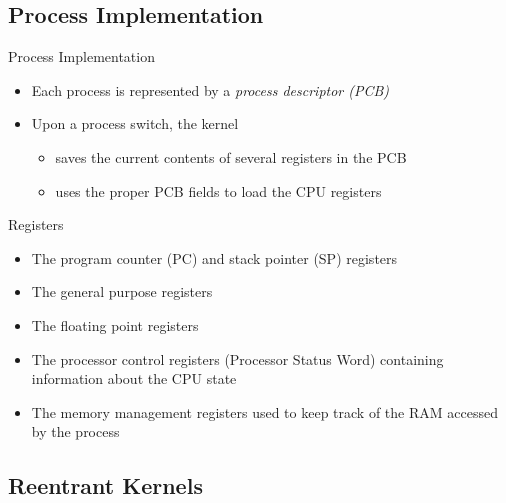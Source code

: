 \subsection{Process Implementation}
\label{sec:proc-impl}

\begin{frame}
  \begin{exampleblock}{Process Implementation}
    \begin{itemize}
    \item Each process is represented by a \emph{process descriptor (PCB)}
    \item Upon a process switch, the kernel
      \begin{itemize}
      \item saves the current contents of several registers in the PCB
      \item uses the proper PCB fields to load the CPU registers
      \end{itemize}
    \end{itemize}
  \end{exampleblock}
  \begin{exampleblock}{Registers}
    \begin{itemize}
    \item The program counter (PC) and stack pointer (SP) registers
    \item The general purpose registers
    \item The floating point registers
    \item The processor control registers (Processor Status Word) containing information
      about the CPU state
    \item The memory management registers used to keep track of the RAM accessed by the
      process
    \end{itemize}
  \end{exampleblock}
\end{frame}

\subsection{Reentrant Kernels}
\label{sec:reentrant-kernels}

